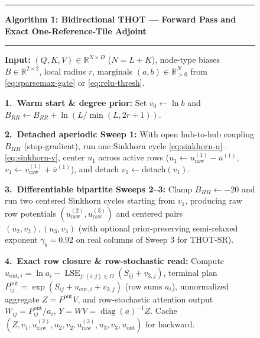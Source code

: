 \documentclass[11pt]{article}
\begin{document}
\begin{figure}[t]
  \centering
  \rule{\linewidth}{0.8pt}
  \vspace{-0.35em}
  \begin{flushleft}
  \small
  \hypertarget{alg:thot}{\textbf{Algorithm 1: Bidirectional THOT --- Forward Pass and Exact One-Reference-Tile Adjoint}}
  \end{flushleft}
  \vspace{-0.45em}
  \rule{\linewidth}{0.4pt}
  \begin{minipage}{\linewidth}
  \small
  \setlength{\parskip}{0.25em}
  \textbf{Input:} $(Q, K, V) \in \mathbb{R}^{N \times D}$ ($N=L+K$), node-type biases $B \in \mathbb{R}^{2\times 2}$, local radius $r$, marginals $(a,b) \in \mathbb{R}_{>0}^N$ from \eqref{eq:sparsemax-gate} or \eqref{eq:relu-thresh}.

  \textbf{1.\ Warm start \& degree prior:} Set $v_0 \leftarrow \ln b$ and $B_{RR} \leftarrow B_{RR} + \ln(L/\min(L,2r+1))$.

  \textbf{2.\ Detached aperiodic Sweep 1:} With open hub-to-hub coupling $B_{HH}$ (stop-gradient), run one Sinkhorn cycle \eqref{eq:sinkhorn-u}--\eqref{eq:sinkhorn-v}, center $u_1$ across active rows ($u_1 \leftarrow u^{(1)}_{\text{raw}} - \bar u^{(1)}$, $v_1 \leftarrow v^{(1)}_{\text{raw}} + \bar u^{(1)}$), and detach $v_1 \leftarrow \mathrm{detach}(v_1)$.

  \textbf{3.\ Differentiable bipartite Sweeps 2--3:} Clamp $B_{HH} \leftarrow -20$ and run two centered Sinkhorn cycles starting from $v_1$, producing raw row potentials $(u^{(2)}_{\text{raw}}, u^{(3)}_{\text{raw}})$ and centered pairs $(u_2, v_2), (u_3, v_3)$ (with optional prior-preserving semi-relaxed exponent $\gamma_b=0.92$ on real columns of Sweep 3 for THOT-SR).

  \textbf{4.\ Exact row closure \& row-stochastic read:} Compute
  $u_{\text{out},i} = \ln a_i - \operatorname{LSE}_{j:(i,j)\in\Omega}(S_{ij} + v_{3,j})$,
  terminal plan $P^{\text{out}}_{ij} = \exp(S_{ij} + u_{\text{out},i} + v_{3,j})$ (row sums $a_i$), unnormalized aggregate $Z = P^{\text{out}} V$, and row-stochastic attention output
  $W_{ij} = P^{\text{out}}_{ij}/a_i$, $Y = W V = \operatorname{diag}(a)^{-1} Z$.
  Cache $(Z, v_1, u^{(2)}_{\text{raw}}, u_2, v_2, u^{(3)}_{\text{raw}}, u_3, v_3, u_{\text{out}})$ for backward.


\end{minipage}
\end{figure}
\end{document}
